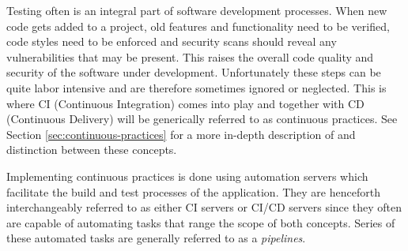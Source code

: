 Testing often is an integral part of software development processes. When new code gets added to a project, old features and functionality need to be verified, code styles need to be enforced and security scans should reveal any vulnerabilities that may be present. This raises the overall code quality and security of the software under development.
Unfortunately these steps can be quite labor intensive and are therefore sometimes ignored or neglected. This is where CI (Continuous Integration) comes into play and together with CD (Continuous Delivery) will be generically referred to as continuous practices. See Section \ref{sec:continuous-practices} for a more in-depth description of and distinction between these concepts.



Implementing continuous practices is done using automation servers which facilitate the build and test processes of the application. They are henceforth interchangeably referred to as either CI servers or CI/CD servers since they often are capable of automating tasks that range the scope of both concepts. Series of these automated tasks are generally referred to as a \textit{pipelines}.

